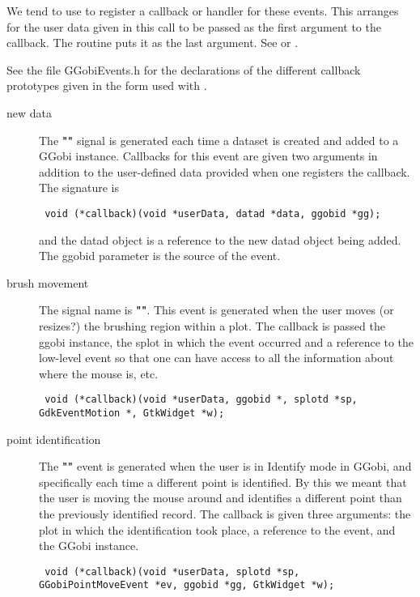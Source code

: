 \documentclass{article}
\def\SignalName#1{\textbf{"\Escape{#1}"}}
\begin{document}
We tend to use  to register a
callback or handler for these events.  This arranges for the user data
given in this call to be passed as the first argument to the callback.
The routine  puts it as the last
argument. See \cite{pennington99} or \cite{gtkTutorial}.

See the file GGobiEvents.h for the declarations of the different
callback prototypes given in the form used with
.

\begin{description}
\item[new data] The \SignalName{datad_added} signal is generated each
  time a dataset is created and added to a GGobi instance.  Callbacks
for this event are given two arguments
in addition to the user-defined data provided when
one registers the callback.
The signature is
\begin{verbatim}
 void (*callback)(void *userData, datad *data, ggobid *gg);
\end{verbatim}
and the datad object is a reference to the new 
datad object being added. The ggobid parameter is the source of the event.

\item[brush movement] 
The signal name is \SignalName{brush_motion}.
This event is generated when the user moves (or
  resizes?)  the brushing region within a plot.  The callback is
  passed the ggobi instance, the splot in which the event occurred and
  a reference to the low-level event so that one can have access to
  all the information about where the mouse is, etc.
\begin{verbatim}
 void (*callback)(void *userData, ggobid *, splotd *sp, GdkEventMotion *, GtkWidget *w);
\end{verbatim}

\item[point identification] The \SignalName{identify_point} event is
generated when the user is in Identify mode in GGobi, and specifically
each time a different point is identified. By this we meant that the
user is moving the mouse around and identifies a different point than
the previously identified record.  The callback is given three
arguments: the plot in which the identification took place, a
reference to the  event, and the GGobi
instance.
\begin{verbatim}
 void (*callback)(void *userData, splotd *sp, GGobiPointMoveEvent *ev, ggobid *gg, GtkWidget *w);
\end{verbatim}


\end{description}
\end{document}
